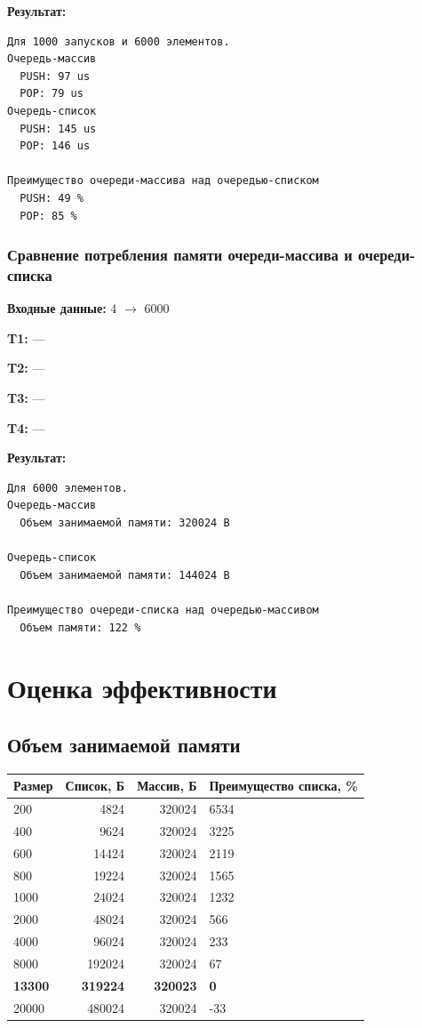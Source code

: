 \documentclass[a4paper,12pt]{extarticle}
\begin{document}
\textbf{Результат: }
\begin{verbatim}
Для 1000 запусков и 6000 элементов.
Очередь-массив
  PUSH: 97 us
  POP: 79 us
Очередь-список
  PUSH: 145 us
  POP: 146 us

Преимущество очереди-массива над очередью-списком
  PUSH: 49 %
  POP: 85 %
\end{verbatim}


\subsubsection{Сравнение потребления памяти очереди-массива и очереди-списка}

\textbf{Входные данные: }
4 $\rightarrow$ 6000

\textbf{T1: }
---

\textbf{T2: }
---

\textbf{T3: }
---

\textbf{T4: }
---


\textbf{Результат: }
\begin{verbatim}
Для 6000 элементов.
Очередь-массив
  Объем занимаемой памяти: 320024 B

Очередь-список
  Объем занимаемой памяти: 144024 B

Преимущество очереди-списка над очередью-массивом
  Объем памяти: 122 %
\end{verbatim}


\section{Оценка эффективности}
\subsection{Объем занимаемой памяти}


\begin{tabular}{ |l|r|r|l| }
\hline
\textbf{Размер} &  \textbf{Список, Б} & \textbf{Массив, Б} & \textbf{Преимущество списка, \%} \\ \hline

200 & 4824 & 320024 & 6534 \\ \hline
400 & 9624 & 320024 & 3225 \\ \hline
600 & 14424 & 320024 & 2119 \\ \hline
800 & 19224 & 320024 & 1565 \\ \hline
1000 & 24024 & 320024 & 1232 \\ \hline
2000 & 48024 & 320024 & 566 \\ \hline
4000 & 96024 & 320024 & 233 \\ \hline
8000 & 192024 & 320024 & 67 \\ \hline
\textbf{13300} & \textbf{319224} & \textbf{320023} & \textbf{0} \\ \hline
20000 & 480024 & 320024 & -33 \\ \hline

\end{tabular}
\end{document}
